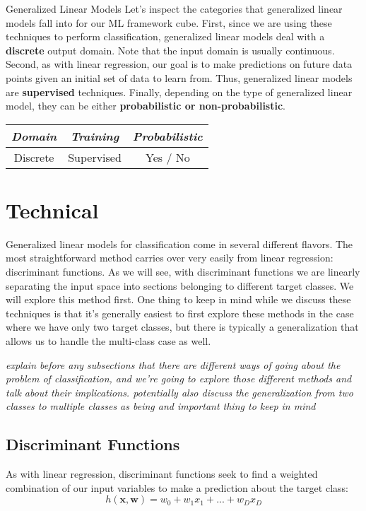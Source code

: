 \begin{mlcube}{Generalized Linear Models}
Let's inspect the categories that generalized linear models fall into for our ML framework cube. First, since we are using these techniques to perform classification, generalized linear models deal with a \textbf{discrete} output domain. Note that the input domain is usually continuous. Second, as with linear regression, our goal is to make predictions on future data points given an initial set of data to learn from. Thus, generalized linear models are \textbf{supervised} techniques. Finally, depending on the type of generalized linear model, they can be either \textbf{probabilistic or non-probabilistic}.
\begin{center}
    \begin{tabular}{c|c|c}
    \textit{\textbf{Domain}} & \textit{\textbf{Training}} & \textit{\textbf{Probabilistic}} \\
    \hline
    Discrete & Supervised & Yes / No \\
    \end{tabular}
\end{center}
\end{mlcube}

\section{Technical}
Generalized linear models for classification come in several different flavors. The most straightforward method carries over very easily from linear regression: discriminant functions. As we will see, with discriminant functions we are linearly separating the input space into sections belonging to different target classes. We will explore this method first. One thing to keep in mind while we discuss these techniques is that it's generally easiest to first explore these methods in the case where we have only two target classes, but there is typically a generalization that allows us to handle the multi-class case as well.

\textit{explain before any subsections that there are different ways of going about the problem of classification, and we're going to explore those different methods and talk about their implications. potentially also discuss the generalization from two classes to multiple classes as being and important thing to keep in mind}

\subsection{Discriminant Functions}
As with linear regression, discriminant functions seek to find a weighted combination of our input variables to make a prediction about the target class:
\begin{equation} \label{basic-discriminant-fn}
	h(\textbf{x}, \textbf{w}) = w_{0} + w_{1}x_{1} + ... + w_{D}x_{D}
\end{equation}

